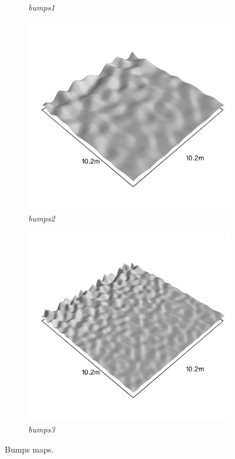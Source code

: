 \documentclass[../document.tex]{subfiles}
\begin{document}
\begin{figure}[H]
\begin{subfigure}[b]{0.23\linewidth}
            \caption{\emph{bumps1}}
            \end{subfigure}    
          \begin{subfigure}[b]{0.23\textwidth}
            \includegraphics[width=\textwidth]{../img/hm3d_borders/bumps2.png}
            \caption{\emph{bumps2}}
        \end{subfigure}    
        \begin{subfigure}[b]{0.23\textwidth}
            \includegraphics[width=\textwidth]{../img/hm3d_borders/bumps3.png}
            \caption{\emph{bumps3}}
        \end{subfigure}    
    \caption{Bumps maps.}
\end{figure}
\end{document}
